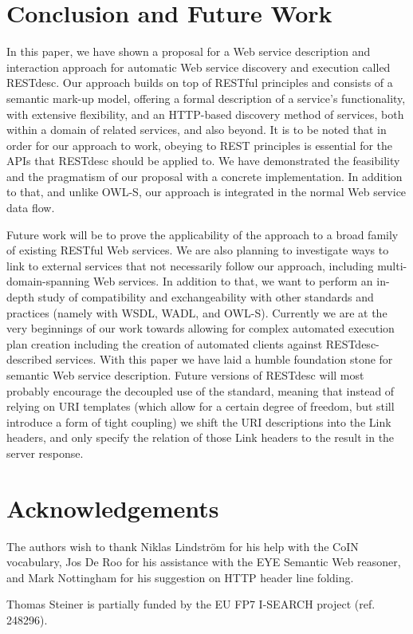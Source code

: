 \documentclass[runningheads,a4paper, twocolumn]{llncs}
\begin{document}
\section{Conclusion and Future Work} \label{sec:conclusion-and-future-work}
In this paper, we have shown a proposal for a Web service description and interaction approach for automatic Web service discovery and execution called RESTdesc. Our approach builds on top of RESTful principles and consists of a semantic mark-up model, offering a formal description of a service's functionality, with extensive flexibility, and an HTTP-based discovery method of services, both within a domain of related services, and also beyond. It is to be noted that in order for our approach to work, obeying to REST principles is essential for the APIs that RESTdesc should be applied to. We have demonstrated the feasibility and the pragmatism of our proposal with a concrete implementation. In addition to that, and unlike OWL-S, our approach is integrated in the normal Web service data flow.

Future work will be to prove the applicability of the approach to a broad family of existing RESTful Web services. We are also planning to investigate ways to link to external services that not necessarily follow our approach, including multi-domain-spanning Web services. In addition to that, we want to perform an in-depth study of compatibility and exchangeability with other standards and practices (namely with WSDL, WADL, and OWL-S). Currently we are at the very beginnings of our work towards allowing for complex automated execution plan creation including the creation of automated clients against RESTdesc-described services. With this paper we have laid a humble foundation stone for semantic Web service description. Future versions of RESTdesc will most probably encourage the decoupled use of the standard, meaning that instead of relying on URI templates (which allow for a certain degree of freedom, but still introduce a form of tight coupling) we shift the URI descriptions into the Link headers, and only specify the relation of those Link headers to the result in the server response.

\section*{Acknowledgements} \label{sec:acknowledgements}
The authors wish to thank Niklas Lindstr\"om for his help with the CoIN vocabulary, Jos De Roo for his assistance with the EYE Semantic Web reasoner, and Mark Nottingham for his suggestion on HTTP header line folding.

{Thomas Steiner is partially funded by the EU FP7 I-SEARCH project (ref. 248296).}{}

\renewcommand{\ttdefault}{cmvtt}
\renewcommand\UrlFont\tt



\end{document}

